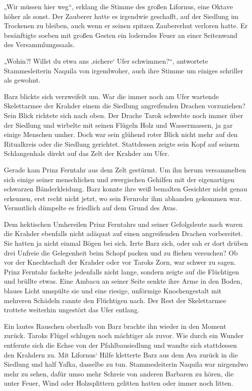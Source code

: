 „Wir müssen hier weg“, erklang die Stimme des großen Lifornus, eine Oktave höher als sonst. Der Zauberer hatte es irgendwie geschafft, auf der Siedlung im Trockenen zu bleiben, auch wenn er seinen spitzen Zaubererhut verloren hatte. Er besänftigte soeben mit großen Gesten ein loderndes Feuer an einer Seitenwand des Versammlungssaals.

„Wohin?! Willst du etwa ans ‚sichere‘ Ufer schwimmen?“, antwortete Stammesleiterin Naquila von irgendwoher, auch ihre Stimme um einiges schriller als gewohnt.

Barz blickte sich verzweifelt um. War die immer noch am Ufer wartende Skelettarmee der Krahder einem die Siedlung angreifenden Drachen vorzuziehen? Sein Blick richtete sich nach oben. Der Drache Tarok schwebte noch immer über der Siedlung und wirbelte mit seinen Flügeln Holz und Wassermassen, ja gar einige Menschen umher. Doch war sein glühend roter Blick nicht mehr auf den Ritualkreis oder die Siedlung gerichtet. Stattdessen zeigte sein Kopf auf seinem Schlangenhals direkt auf das Zelt der Krahder am Ufer.

Gerade kam Prinz Ferntahr aus dem Zelt gestürmt. Um ihn herum versammelten sich einige seiner menschlichen und zwergischen Gehilfen mit der eigenartigen schwarzen Bänderkleidung. Barz konnte ihre weiß bemalten Gesichter nicht genau erkennen, erst recht nicht jetzt, wo sein Fernrohr ihm abhanden gekommen war. Vermutlich dümpelte es friedlich auf dem Grund des Avas.

Dem hektischen Umhereilen Prinz Ferntahrs und seiner Gefolgsleute nach waren die Krahder ebenfalls nicht adäquat auf einen angreifenden Drachen vorbereitet. Sie hatten ja nicht einmal Bögen bei sich. Irrte Barz sich, oder sah er dort drüben drei Unfreie die Gelegenheit beim Schopf packen und zu fliehen versuchen? Ob vor der Knechtschaft der Krahder oder vor Taroks Zorn, war schwer zu sagen. Prinz Ferntahr fackelte jedenfalls nicht lange, sondern zeigte auf die Flüchtigen und brüllte etwas. Eine Ambacu an seiner Seite senkte ihre Arme in den Boden, blaues Licht umspülte sie und eine riesige, unförmige Knochengestalt mit mehreren Schädeln rannte den Flüchtigen nach. Der Rest der Skelettarmee trottete weiterhin ungestört das Ufer entlang.

Ein lautes Rauschen oberhalb von Barz brachte ihn wieder in den Moment zurück. Taroks Flügel schlugen noch mächtiger als zuvor. Wie durch ein Wunder entfernte sich die Echse von der Pfahlbausiedlung und wandte sich stattdessen den Krahdern zu. Mit Lifornus‘ Hilfe kletterte Barz aus dem Ava zurück in die Siedlung und half Yafka, dasselbe zu tun. Stammesleiterin Naquila war nirgendwo mehr zu sehen, dafür umso mehr Schreie von anderen Barbaren zu hören, die unter Feuer, Wind oder Holzsplittern gelitten hatten oder immer noch litten.

